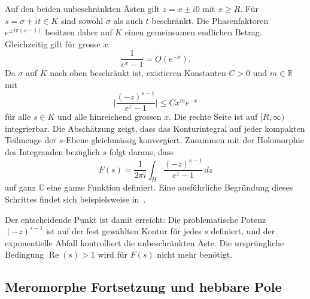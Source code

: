 Auf den beiden unbeschränkten Ästen gilt $z=x\pm i0$ mit $x\geq R$. 
Für $s=\sigma+it\in K$ sind sowohl $\sigma$ als auch $t$ beschränkt. 
Die Phasenfaktoren $e^{\pm i\pi(s-1)}$ besitzen daher auf $K$ einen gemeinsamen endlichen Betrag. 
Gleichzeitig gilt für grosse $x$
\begin{equation}
\frac{1}{e^x-1}
=
O(e^{-x}).
\label{hankel:eq:nenner-exponentiell}
\end{equation}
Da $\sigma$ auf $K$ nach oben beschränkt ist, existieren Konstanten $C>0$ und $m\in\mathbb R$ mit
\begin{equation}
\biggl|
\frac{(-z)^{s-1}}{e^z-1}
\biggr|
\leq
C x^m e^{-x}
\label{hankel:eq:fortsetzung-majorante}
\end{equation}
für alle $s\in K$ und alle hinreichend grossen $x$. 
Die rechte Seite ist auf $[R,\infty)$ integrierbar. 
Die Abschätzung zeigt, dass das Konturintegral auf jeder kompakten Teilmenge der $s$-Ebene gleichmässig konvergiert. 
Zusammen mit der Holomorphie des Integranden bezüglich $s$ folgt daraus, dass
\begin{equation}
	F(s)
	=
	\frac{1}{2\pi i}
	\int_H
	\frac{(-z)^{s-1}}{e^z-1}\,dz
\end{equation}
auf ganz $\mathbb{C}$ eine ganze Funktion definiert. 
Eine ausführliche Begründung dieses Schrittes findet sich beispielsweise in~\cite{hankel:titchmarsh}.

Der entscheidende Punkt ist damit erreicht: Die problematische Potenz $(-z)^{s-1}$ ist auf der fest gewählten Kontur für jedes $s$ definiert, und der exponentielle Abfall kontrolliert die unbeschränkten Äste. 
Die ursprüngliche Bedingung $\operatorname{Re}(s)>1$ wird für $F(s)$ nicht mehr benötigt.

\subsection{Meromorphe Fortsetzung und hebbare Pole}

